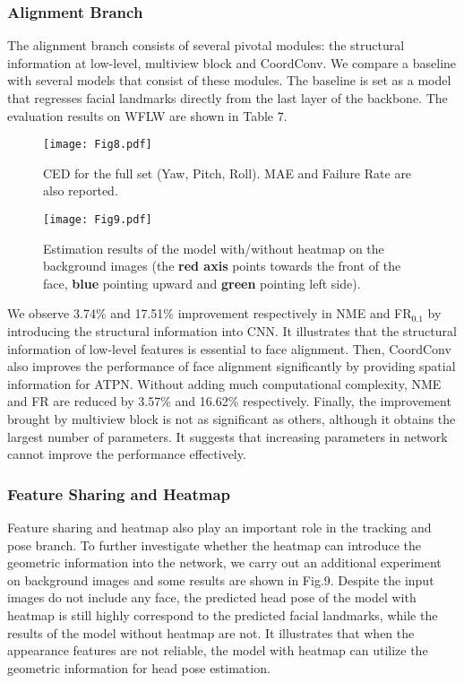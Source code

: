 \documentclass[3p,twocolumn, round, sort & compress]{elsarticle}
\begin{document}
\subsubsection{Alignment Branch}
The alignment branch consists of several pivotal modules: the structural information at low-level, multiview block and CoordConv. We compare a baseline with several models that consist of these modules. The baseline is set as a model that regresses facial landmarks directly from the last layer of the backbone. The evaluation results on WFLW are shown in Table 7.



\begin{figure}[t!]
	\centering
	\texttt{[image: Fig8.pdf]}
	\caption{CED for the full set (Yaw, Pitch, Roll). MAE and Failure Rate are also reported.}
	\label{fig8}
\end{figure}

\begin{figure}[t!]
	\centering
	\texttt{[image: Fig9.pdf]}
	\caption{Estimation results of the model with/without heatmap on the background images (the {\color{red} \textbf{red axis}} points towards the front of the face, {\color{blue} \textbf{blue}} pointing upward and {\color{green} \textbf{green}} pointing left side).}
	\label{fig9}
\end{figure}

We observe 3.74\% and 17.51\% improvement respectively in NME and FR$_{0.1}$ by introducing the structural information into CNN. It illustrates that the structural information of low-level features is essential to face alignment. Then, CoordConv also improves the performance of face alignment significantly by providing spatial information for ATPN. Without adding much computational complexity, NME and FR are reduced by 3.57\% and 16.62\% respectively. Finally, the improvement brought by multiview block is not as significant as others, although it obtains the largest number of parameters. It suggests that increasing parameters in network cannot improve the performance effectively. 

\subsubsection{Feature Sharing and Heatmap}
Feature sharing and heatmap also play an important role in the tracking and pose branch. To further investigate whether the heatmap can introduce the geometric information into the network, we carry out an additional experiment on background images and some results are shown in Fig.9. Despite the input images do not include any face, the predicted head pose of the model with heatmap is still highly correspond to the predicted facial landmarks, while the results of the model without heatmap are not. It illustrates that when the appearance features are not reliable, the model with heatmap can utilize the geometric information for head pose estimation.
\end{document}
